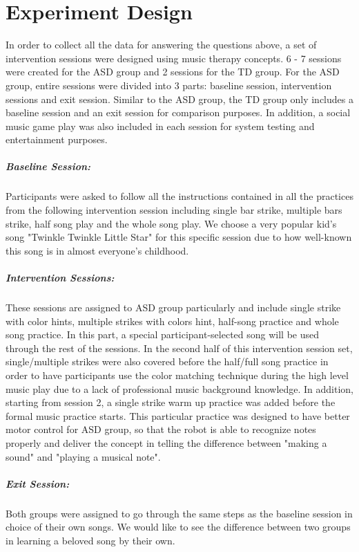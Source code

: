 \section{Experiment Design}
In order to collect all the data for answering the questions above, a set of
intervention sessions were designed using music therapy concepts. 6 - 7 sessions
were created for the ASD group and 2 sessions for the TD group. For the ASD group, entire
sessions were divided into 3 parts: baseline session, intervention sessions
and exit session. Similar to the ASD group, the TD group only includes a baseline session
and an exit session for comparison purposes. In addition, a social music
game play was also included in each session for system testing and entertainment
purposes.\\

\subparagraph{Baseline Session: }Participants were asked to follow all the 
instructions contained in all the practices from the following intervention session 
including single bar strike, multiple bars strike, half song play and the whole
song play. We choose a very popular kid's song "Twinkle Twinkle Little Star" 
for this specific session due to how well-known this song is in almost 
everyone's childhood.\\

\subparagraph{Intervention Sessions: }These sessions are assigned to ASD group
particularly and include single strike with color hints, multiple strikes with
colors hint, half-song practice and whole song practice. In this part, a special
participant-selected song will be used through the rest of the sessions. In the second
half of this intervention session set, single/multiple strikes were also covered
before the half/full song practice in order to have participants use the
color matching technique during the high level music play due to a lack of professional
music background knowledge. In addition, starting from session 2, a single strike
warm up practice was added before the formal music practice starts. This particular
practice was designed to have better motor control for ASD group, so that
the robot is able to recognize notes properly and deliver the concept in telling the
difference between "making a sound" and "playing a musical note". \\

\subparagraph{Exit Session: }Both groups were assigned to go through the same steps
as the baseline session in choice of their own songs. We would like to see the 
difference between two groups in learning a beloved song by their own.\\

